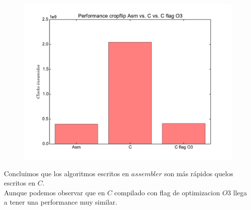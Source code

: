 \newpage

\begin{figure}
  \begin{center}
	\includegraphics[scale=0.5]{cropflip.pdf}
  \end{center}
\end{figure}

Concluimos que los algoritmos escritos en $assembler$ son más rápidos quelos escritos en $C$. \\
Aunque podemos observar que en $C$ compilado con flag de optimizacion $O3$ llega a tener una performance muy similar.  \\
